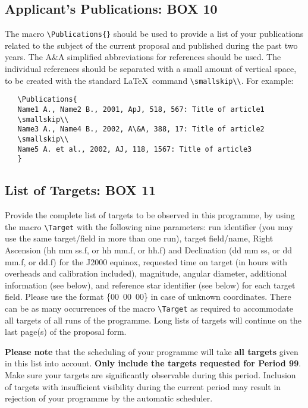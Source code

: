 \documentclass{article}
\begin{document}
\subsection{Applicant's  Publications: {\bf BOX 10}}

The macro \verb|\Publications{}| should be used to 
provide a list of your publications related to the
subject of the current proposal and published during the past two
years. The A\&A simplified abbreviations for references should be
used. The individual references should be separated with a small
amount of vertical space, to be created with the standard \LaTeX\
command \verb|\smallskip\\|. For example:
\begin{verbatim}
   \Publications{
   Name1 A., Name2 B., 2001, ApJ, 518, 567: Title of article1
   \smallskip\\
   Name3 A., Name4 B., 2002, A\&A, 388, 17: Title of article2
   \smallskip\\
   Name5 A. et al., 2002, AJ, 118, 1567: Title of article3
   }
\end{verbatim}

\subsection{List of Targets: {\bf BOX 11}}
  
Provide the complete list of targets to be observed in this programme,
by using the macro \verb|\Target| 
with the following nine parameters: run identifier (you may use the same
target/field in more than one run), target field/name, Right Ascension
(hh mm ss.f, or hh mm.f, or hh.f) and Declination (dd mm ss, or dd
mm.f, or dd.f) for the 
J2000 equinox, requested time on target (in hours
with overheads and calibration included), magnitude, angular diameter,
additional information (see below), and reference star identifier
(see below)
for each target field.  Please use the format \{00~00~00\}
in case of unknown coordinates. There can be as many occurrences of
the macro \verb|\Target| as required to accommodate all targets of all
runs of the programme. Long lists of targets will continue
on the last page(s) of the proposal form.

{\bf Please note} that the scheduling of your programme will take
{\bf all targets} given in this list into account. {\bf Only include
 the targets requested for Period 99}.
Make sure your targets
are significantly observable during this period.  Inclusion of targets
with insufficient visibility during the current period may result in
rejection of your programme by the automatic scheduler.
\end{document}

